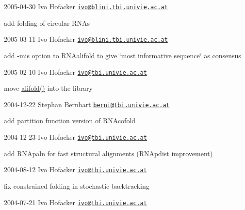 2005-\/04-\/30 Ivo Hofacker \href{mailto:ivo@blini.tbi.univie.ac.at}{\tt ivo@blini.\+tbi.\+univie.\+ac.\+at}


\begin{DoxyItemize}
\item add folding of circular R\+N\+As
\end{DoxyItemize}

2005-\/03-\/11 Ivo Hofacker \href{mailto:ivo@blini.tbi.univie.ac.at}{\tt ivo@blini.\+tbi.\+univie.\+ac.\+at}


\begin{DoxyItemize}
\item add -\/mis option to R\+N\+Aalifold to give \char`\"{}most informative
	  sequence\char`\"{} as consensus
\end{DoxyItemize}

2005-\/02-\/10 Ivo Hofacker \href{mailto:ivo@tbi.univie.ac.at}{\tt ivo@tbi.\+univie.\+ac.\+at}


\begin{DoxyItemize}
\item move \mbox{\hyperlink{group__consensus__mfe__fold_ga4cf00f0659e5f0480335d69e797f05b1}{alifold()}} into the library
\end{DoxyItemize}

2004-\/12-\/22 Stephan Bernhart \href{mailto:berni@tbi.univie.ac.at}{\tt berni@tbi.\+univie.\+ac.\+at}


\begin{DoxyItemize}
\item add partition function version of R\+N\+Acofold
\end{DoxyItemize}

2004-\/12-\/23 Ivo Hofacker \href{mailto:ivo@tbi.univie.ac.at}{\tt ivo@tbi.\+univie.\+ac.\+at}


\begin{DoxyItemize}
\item add R\+N\+Apaln for fast structural alignments (R\+N\+Apdist improvement)
\end{DoxyItemize}

2004-\/08-\/12 Ivo Hofacker \href{mailto:ivo@tbi.univie.ac.at}{\tt ivo@tbi.\+univie.\+ac.\+at}


\begin{DoxyItemize}
\item fix constrained folding in stochastic backtracking
\end{DoxyItemize}

2004-\/07-\/21 Ivo Hofacker \href{mailto:ivo@tbi.univie.ac.at}{\tt ivo@tbi.\+univie.\+ac.\+at}


